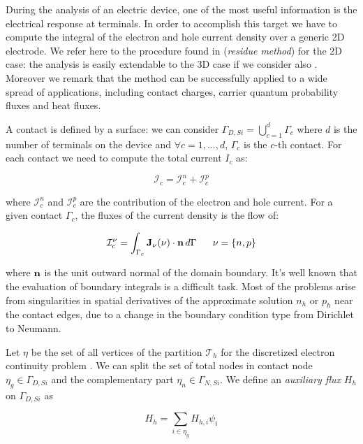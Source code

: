 During the analysis of an electric device, one of the most useful information is the electrical response at terminals. In order to accomplish this target we have to compute the integral of the electron and hole current density over a generic 2D electrode. We refer here to the procedure found in \cite{ContactCurrentRM} (\textit{residue method}) for the 2D case: the analysis is easily extendable to the 3D case if we consider also \cite{GalerkMethConsHughes}. Moreover we remark that the method can be successfully applied to a wide spread of applications, including contact charges, carrier quantum probability fluxes and heat fluxes.

A contact is defined by a surface: we can consider $\Gamma_{D,Si} = \bigcup_{c=1}^d \Gamma_c$ where $d$ is the number of terminals on the device and $\forall c=1,...,d$, $\Gamma_c$ is the $c$-th contact. For each contact we need to compute the total current $I_c$ as:

\begin{equation}
\mathcal{I}_c = \mathcal{I}_c^n + \mathcal{I}_c^p
\end{equation}

where $\mathcal{I}_c^n$ and $\mathcal{I}_c^p$ are the contribution of the electron and hole current.
For a given contact $\Gamma_c$, the fluxes of the current density is the flow of:

\begin{equation}
\label{eq: current flux}
\mathcal{I}_c^\nu = \int_{\Gamma_c}\vect{J}_\nu(\nu) \cdot \vect{n} \, d{\Gamma} \psp{10} \nu = \{n,p\}
\end{equation}

where $\mathbf{n}$ is the unit outward normal of the domain boundary. It's well known that the evaluation of boundary integrals is a difficult task. Most of the problems  arise from singularities in spatial derivatives of the approximate solution $n_h$ or $p_h$ near the contact edges, due to a change in the boundary condition type from Dirichlet to Neumann.

Let $\eta$ be the set of all vertices of the partition $\mathcal{T}_h$ for the discretized electron continuity problem . We can split the set of total nodes in contact node $\eta_g \in \Gamma_{D,Si}$ and the complementary part $\eta_n \in \Gamma_{N,Si}$. We define an \textit{auxiliary flux} $H_h$ on $\Gamma_{D,Si}$ as

\begin{equation}
H_h = \sum_{i\in\eta_g} H_{h,i} \psi_i 
\end{equation}


